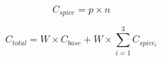 \documentclass{article}
\begin{document}
\[C_{spice} = p \times n
\]
\pagebreak

\[C_{total} = W \times C_{base} + W \times \sum_{i=1}^{3} C_{spice_i}
\]
\pagebreak
\end{document}
